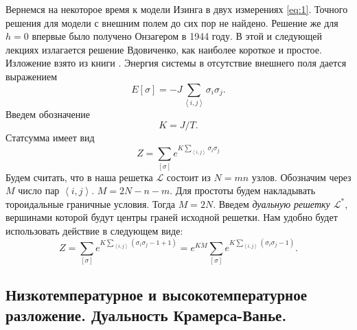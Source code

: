 \documentclass[a4paper,12pt]{article}
\theoremstyle{definition}
\theoremstyle{definition}
\theoremstyle{definition}
\begin{document}
Вернемся на некоторое время к модели Изинга в двух измерениях \eqref{eq:1}. Точного решения для модели с внешним полем до сих пор не найдено. Решение же для $h=0$ впервые было получено Онзагером в 1944 году. В этой и следующей лекциях излагается решение Вдовиченко, как наиболее короткое и простое. Изложение взято из книги \cite{belavin2001lect}.
Энергия системы в отсутствие внешнего поля дается выражением
\begin{equation}
  \label{eq:98}
  E[\sigma]=-J\sum_{\left<i,j\right>}\sigma_i \sigma_j .
\end{equation}
Введем обозначение
\begin{equation}
  \label{eq:99}
  K=J/T.
\end{equation}
Статсумма имеет вид
\begin{equation}
  \label{eq:100}
  Z=\sum_{[\sigma]}e^{K\sum_{\left<i,j\right>}\sigma_i\sigma_j}
\end{equation}
Будем считать, что в наша решетка $\mathcal{L}$ состоит из $N=mn$ узлов. Обозначим через $M$ число пар $\left<i,j\right>$. $M=2N-n-m$. Для простоты будем накладывать тороидальные граничные условия. Тогда $M=2N$. Введем {\it дуальную решетку $\mathcal{L}^*$}, вершинами которой будут центры граней исходной решетки. 
Нам удобно будет использовать действие в следующем виде:
\begin{equation}
  \label{eq:101}
  Z=\sum_{[\sigma]}e^{K\sum_{\left<i,j\right>}(\sigma_i\sigma_j-1+1)}=e^{KM} \sum_{[\sigma]}e^{K\sum_{\left<i,j\right>}(\sigma_i\sigma_j-1)}.
\end{equation}

\subsection{Низкотемпературное и высокотемпературное разложение. Дуальность Крамерса-Ванье.}
\label{sec:low-high-temp}
\end{document}
